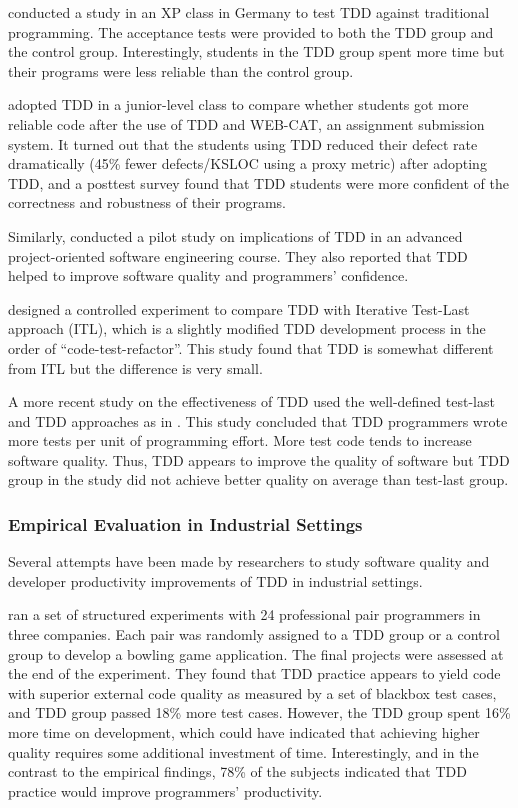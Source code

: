 \documentclass[smallextended]{svjour3}     %
\begin{document}
\cite{Muller:02} conducted a study in an XP class in
Germany to test TDD against traditional programming.  The acceptance tests
were provided to both the TDD group and the control group. Interestingly,
students in the TDD group spent more time but their programs were less
reliable than the control group.

\cite{Edwards:04} adopted TDD in a junior-level class to compare
whether students got more reliable code after the use of TDD and WEB-CAT,
an assignment submission system. It turned out that the students using TDD
reduced their defect rate dramatically (45\% fewer defects/KSLOC using a
proxy metric) after adopting TDD, and a posttest survey found that TDD
students were more confident of the correctness and robustness of their
programs.

Similarly, \cite{Kaufmann:03} conducted a pilot study
on implications of TDD in an advanced project-oriented software engineering
course. They also reported that TDD helped to improve software quality and
programmers' confidence.

\cite{Matjaz:03} designed a controlled experiment to compare TDD with
Iterative Test-Last approach (ITL), which is a slightly modified TDD
development process in the order of ``code-test-refactor''.  This study
found that TDD is somewhat different from ITL but the difference is very
small.

A more recent study on the effectiveness of TDD 
\citep{Erdogmus:05} used the well-defined test-last
and TDD approaches as in \cite{Matjaz:03}. This study
concluded that TDD programmers wrote more tests per unit of programming
effort. More test code tends to increase software quality. Thus, TDD
appears to improve the quality of software but TDD group in the study did
not achieve better quality on average than test-last group.

\subsubsection{Empirical Evaluation in Industrial Settings}
Several attempts have been made by researchers to study software quality
and developer productivity improvements of TDD in industrial settings.  

\cite{George:04} ran a set of structured experiments
with 24 professional pair programmers in three companies. Each pair was
randomly assigned to a TDD group or a control group to develop a bowling
game application. The final projects were assessed at the end of the
experiment.  They found that TDD practice appears to yield code with
superior external code quality as measured by a set of blackbox test cases,
and TDD group passed 18\% more test cases. However, the TDD group spent
16\% more time on development, which could have indicated that achieving
higher quality requires some additional investment of time. Interestingly,
and in the contrast to the empirical findings, 78\% of the subjects
indicated that TDD practice would improve programmers' productivity.
\end{document}
